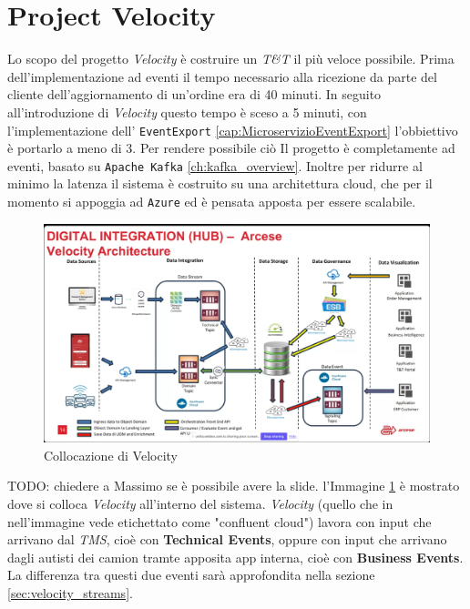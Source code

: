 \section{Project Velocity}
\label{sec:project_velocity}
Lo scopo del progetto \textit{Velocity} è costruire un \textit{T\&T} il più veloce possibile.
Prima dell'implementazione ad eventi il tempo necessario alla ricezione da parte del cliente dell'aggiornamento di un'ordine era di 40 minuti.
In seguito all'introduzione di \textit{Velocity} questo tempo è sceso a 5 minuti, con l'implementazione dell' \texttt{EventExport} \ref{cap:MicroservizioEventExport} l'obbiettivo è portarlo a meno di 3.
Per rendere possibile ciò Il progetto è completamente ad eventi, basato su \texttt{Apache Kafka} \ref{ch:kafka_overview}. 
Inoltre per ridurre al minimo la latenza il sistema è costruito su una architettura cloud, che per il momento si appoggia ad \texttt{Azure} ed è pensata apposta per essere scalabile.
\begin{figure}[H]
    \centering
    \includegraphics[width=\textwidth]{images/architecture/collocazione_velocity.png}
    \caption{Collocazione di Velocity}
    \label{fig:collocazione_velocity_img}
\end{figure}
TODO: chiedere a Massimo se è possibile avere la slide.
l'Immagine \ref{fig:collocazione_velocity_img} è mostrato dove si colloca \textit{Velocity} all'interno del sistema.
\textit{Velocity} (quello che in nell'immagine vede etichettato come "confluent cloud") lavora con input che arrivano dal \textit{TMS}, cioè con \textbf{Technical Events},
oppure con input che arrivano dagli autisti dei camion tramte apposita app interna, cioè con \textbf{Business Events}.
La differenza tra questi due eventi sarà approfondita nella sezione \ref{sec:velocity_streams}.


